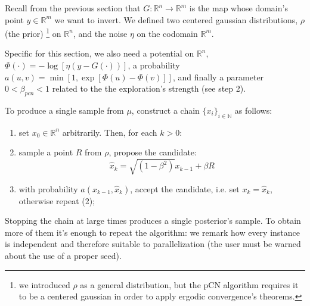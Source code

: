 \documentclass[9pt]{article}
\begin{document}
Recall from the
previous section that
$G : \mathbb{R}^n \to \mathbb{R}^m$ is the map whose domain's point
$y \in \mathbb{R}^m$ we want to invert.
We defined two centered gaussian distributions, $\rho$ (the prior)
\footnote{we introduced $\rho$ as a general distribution,
but the pCN algorithm requires it to be
a centered gaussian in order to apply
ergodic convergence's theorems.}
on $\mathbb{R}^n$, and the noise $\eta$ on the codomain $\mathbb{R}^m$.


Specific for this section, we also need a potential on $\mathbb{R}^n$,
	$\Phi( \cdot ) = - \log [ \eta(y - G( \cdot ) ) ]$,
a probability
	$a ( u, v ) = \min [ 1, \exp[ \Phi(u) - \Phi (v)] ]$, 
and finally a parameter $0 < \beta_{pcn} < 1$ related to the 
the exploration's strength (see step 2).


To produce a single sample from $\mu$, construct a chain 
$\{ x_i \} _{i \in \mathbb{N} }$ as follows:

\begin{enumerate}
	\item set $x_0 \in \mathbb{R}^n$ arbitrarily. Then, for each
		$k > 0$:
	\item sample a point $R$ from $\rho$, propose the candidate: 
		\begin{equation}
		\hat{x}_{k} = \sqrt{(1 - \beta^2)} x_{k-1}
			+ \beta R
		\end{equation}
	\item	with probability $a(x_{k-1}, \hat{x}_k)$,
		accept the candidate, i.e. set $x_{k} = \hat{x}_{k}$, 
		otherwise repeat (2);
\end{enumerate}
Stopping the chain at large times produces a single
posterior's sample. To obtain more of them it's enough to repeat
the algorithm: we remark how every instance is
independent and therefore suitable to parallelization
(the user must be warned about the use of a proper seed).
\end{document}
